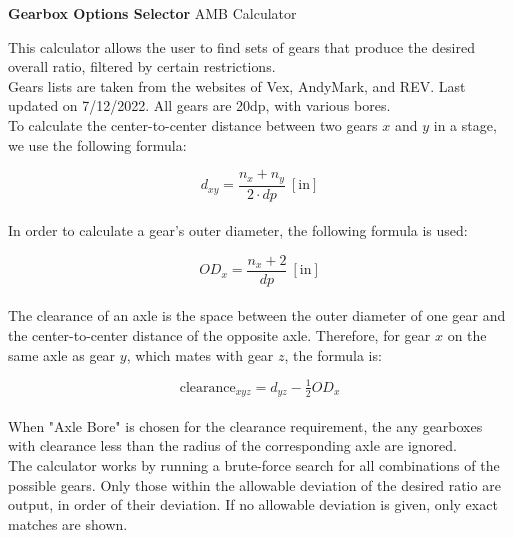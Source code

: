 \documentclass[a4paper]{article}
\begin{document}
	
	\Huge\textbf{Gearbox Options Selector}
	\newline
	\LARGE AMB Calculator
	
	\vspace{0.5cm}
	\normalsize
	
	This calculator allows the user to find sets of gears that produce the desired overall ratio, filtered by certain restrictions.\\
	
	Gears lists are taken from the websites of Vex, AndyMark, and REV. Last updated on 7/12/2022. All gears are 20dp, with various bores.\\
	
	To calculate the center-to-center distance between two gears $ x $ and $ y $ in a stage, we use the following formula:
	
	\begin{equation}
		d_{xy} = \frac{n_x + n_y}{2 \cdot dp}\ \left[ \text{in} \right]
	\end{equation}\\
	
	In order to calculate a gear's outer diameter, the following formula is used:
	
	\begin{equation}
		OD_x = \frac{n_x + 2}{dp}\ \left[ \text{in} \right]
	\end{equation}\\
	
	The clearance of an axle is the space between the outer diameter of one gear and the center-to-center distance of the opposite axle. Therefore, for gear $ x $ on the same axle as gear $ y $, which mates with gear $ z $, the formula is:
	
	\begin{equation}
		\text{clearance}_{xyz} = d_{yz} - \tfrac{1}{2} OD_x
	\end{equation}\\
	
	When "Axle Bore" is chosen for the clearance requirement, the any gearboxes with clearance less than the radius of the corresponding axle are ignored.\\
	
	The calculator works by running a brute-force search for all combinations of the possible gears. Only those within the allowable deviation of the desired ratio are output, in order of their deviation. If no allowable deviation is given, only exact matches are shown.
	
	
\end{document}
